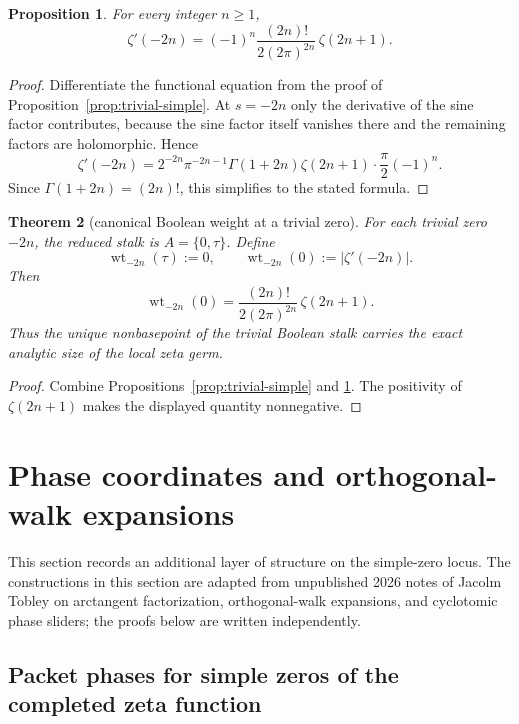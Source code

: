 \documentclass[11pt,a4paper]{article}
\newtheorem{theorem}{Theorem}[section]
\newtheorem{proposition}[theorem]{Proposition}
\theoremstyle{definition}
\theoremstyle{remark}
\newcommand{\taup}{\tau}
\begin{document}
\begin{proposition}\label{prop:trivial-derivative-formula}
For every integer $n\geq1$,
\[
\zeta'(-2n)=(-1)^n\frac{(2n)!}{2(2\pi)^{2n}}\,\zeta(2n+1).
\]
\end{proposition}

\begin{proof}
Differentiate the functional equation from the proof of Proposition~\ref{prop:trivial-simple}. At $s=-2n$ only the derivative of the sine factor contributes, because the sine factor itself vanishes there and the remaining factors are holomorphic. Hence
\[
\zeta'(-2n)=2^{-2n}\pi^{-2n-1}\Gamma(1+2n)\zeta(2n+1)\cdot \frac\pi2(-1)^n.
\]
Since $\Gamma(1+2n)=(2n)!$, this simplifies to the stated formula.
\end{proof}

\begin{theorem}[canonical Boolean weight at a trivial zero]\label{thm:boolean-weight}
For each trivial zero $-2n$, the reduced stalk is $A=\{0,\taup\}$. Define
\[
\operatorname{wt}_{-2n}(\taup):=0,
\qquad
\operatorname{wt}_{-2n}(0):=|\zeta'(-2n)|.
\]
Then
\[
\operatorname{wt}_{-2n}(0)=\frac{(2n)!}{2(2\pi)^{2n}}\,\zeta(2n+1).
\]
Thus the unique nonbasepoint of the trivial Boolean stalk carries the exact analytic size of the local zeta germ.
\end{theorem}

\begin{proof}
Combine Propositions~\ref{prop:trivial-simple} and \ref{prop:trivial-derivative-formula}. The positivity of $\zeta(2n+1)$ makes the displayed quantity nonnegative.
\end{proof}

\section{Phase coordinates and orthogonal-walk expansions}\label{sec:phase-coordinates}

This section records an additional layer of structure on the simple-zero locus. The constructions in this section are adapted from unpublished 2026 notes of Jacolm Tobley on arctangent factorization, orthogonal-walk expansions, and cyclotomic phase sliders; the proofs below are written independently.

\subsection{Packet phases for simple zeros of the completed zeta function}
\end{document}
